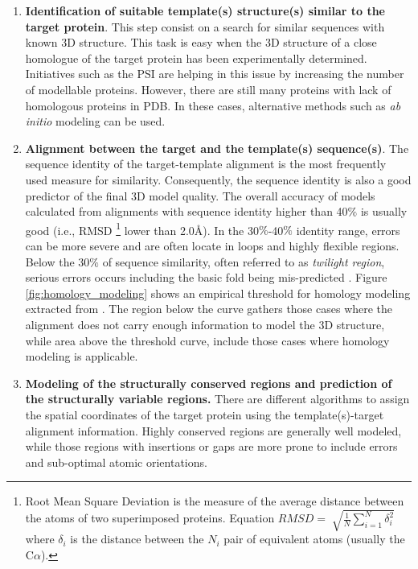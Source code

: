 \documentclass[12pt, b5paper,twoside]{tesi_upf}
\begin{document}
\begin{enumerate}
\item \textbf{Identification of suitable template(s) structure(s) similar to the target protein}. This step consist on a search for similar sequences with known 3D structure. This task is easy when the 3D structure of a close homologue of the target protein has been experimentally determined. Initiatives such as the PSI \cite{Norvell2007} are helping in this issue by increasing the number of modellable proteins. However, there are still many proteins with lack of homologous proteins in PDB. In these cases, alternative methods such as \textit{ab initio} modeling can be used.  

\item \textbf{Alignment between the target and the template(s) sequence(s)}. The sequence identity of the target-template alignment is the most frequently used measure for similarity. Consequently, the sequence identity is also a good predictor of the final 3D model quality. The overall accuracy of models calculated from alignments with sequence identity higher than 40$\%$ is usually good (i.e., RMSD \footnote{Root Mean Square Deviation is the measure of the average distance between the atoms of two superimposed proteins. Equation $RMSD=\sqrt[]{\frac{1}{N} \sum\limits_{i=1}^N \delta_i^2}$ where $\delta_i$ is the distance between the $N_i$ pair of equivalent atoms (usually the C$\alpha$).}  lower than 2.0\AA). In the 30$\%$-40$\%$ identity range, errors can be more severe and are often locate in loops and highly flexible regions. Below the 30$\%$ of sequence similarity, often referred to as \textit{twilight region}, serious errors occurs including the basic fold being mis-predicted \cite{Baker2001, twilight1996}.
Figure \ref{fig:homology_modeling} shows an empirical threshold for homology modeling extracted from \cite{Sander1991}. The region below the curve gathers those cases where the alignment does not carry enough information to model the 3D structure, while area above the threshold curve, include those cases where homology modeling is applicable.  
\item \textbf{Modeling of the structurally conserved regions and prediction of the structurally variable regions.} There are different algorithms to assign the spatial coordinates of the target protein using the template(s)-target alignment information. Highly conserved regions are generally well modeled, while those regions with insertions or gaps are more prone to include errors and sub-optimal atomic orientations. 


\end{enumerate}
\end{document}
